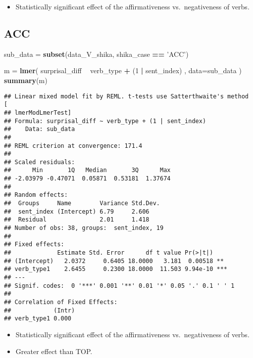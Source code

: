 \documentclass[]{ltjsarticle}
\newenvironment{Shaded}{\begin{snugshade}}{\end{snugshade}}
\newcommand{\KeywordTok}[1]{\textcolor[rgb]{0.13,0.29,0.53}{\textbf{#1}}}
\newcommand{\DataTypeTok}[1]{\textcolor[rgb]{0.13,0.29,0.53}{#1}}
\newcommand{\DecValTok}[1]{\textcolor[rgb]{0.00,0.00,0.81}{#1}}
\newcommand{\StringTok}[1]{\textcolor[rgb]{0.31,0.60,0.02}{#1}}
\newcommand{\OperatorTok}[1]{\textcolor[rgb]{0.81,0.36,0.00}{\textbf{#1}}}
\newcommand{\NormalTok}[1]{#1}
\providecommand{\tightlist}{%
  \setlength{\itemsep}{0pt}\setlength{\parskip}{0pt}}
\begin{document}
\begin{itemize}
\tightlist
\item
  Statistically significant effect of the affirmativeness
  vs.~negativeness of verbs.
\end{itemize}

\subsection{ACC}\label{acc}

\begin{Shaded}
\begin{Highlighting}[]
\NormalTok{sub_data =}\StringTok{ }\KeywordTok{subset}\NormalTok{(data_V_shika, shika_case }\OperatorTok{==}\StringTok{ 'ACC'}\NormalTok{)}

\NormalTok{m =}\StringTok{ }\KeywordTok{lmer}\NormalTok{(}
\NormalTok{        surprisal_diff}
            \OperatorTok{~}\StringTok{ }\NormalTok{verb_type}
                \OperatorTok{+}\StringTok{ }\NormalTok{(}\DecValTok{1} \OperatorTok{|}\StringTok{ }\NormalTok{sent_index)}
\NormalTok{        ,}
        \DataTypeTok{data=}\NormalTok{sub_data}
\NormalTok{        )}
\KeywordTok{summary}\NormalTok{(m)}
\end{Highlighting}
\end{Shaded}

\begin{verbatim}
## Linear mixed model fit by REML. t-tests use Satterthwaite's method [
## lmerModLmerTest]
## Formula: surprisal_diff ~ verb_type + (1 | sent_index)
##    Data: sub_data
## 
## REML criterion at convergence: 171.4
## 
## Scaled residuals: 
##      Min       1Q   Median       3Q      Max 
## -2.03979 -0.47071  0.05871  0.53181  1.37674 
## 
## Random effects:
##  Groups     Name        Variance Std.Dev.
##  sent_index (Intercept) 6.79     2.606   
##  Residual               2.01     1.418   
## Number of obs: 38, groups:  sent_index, 19
## 
## Fixed effects:
##             Estimate Std. Error      df t value Pr(>|t|)    
## (Intercept)   2.0372     0.6405 18.0000   3.181  0.00518 ** 
## verb_type1    2.6455     0.2300 18.0000  11.503 9.94e-10 ***
## ---
## Signif. codes:  0 '***' 0.001 '**' 0.01 '*' 0.05 '.' 0.1 ' ' 1
## 
## Correlation of Fixed Effects:
##            (Intr)
## verb_type1 0.000
\end{verbatim}

\begin{itemize}
\tightlist
\item
  Statistically significant effect of the affirmativeness
  vs.~negativeness of verbs.
\item
  Greater effect than TOP.
\end{itemize}
\end{document}
